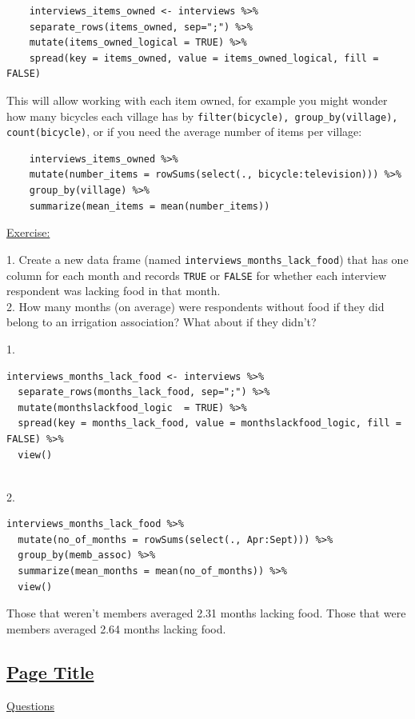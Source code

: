 \documentclass[12pt]{article}
\begin{document}
\begin{verbatim}
    interviews_items_owned <- interviews %>%
    separate_rows(items_owned, sep=";") %>%
    mutate(items_owned_logical = TRUE) %>%
    spread(key = items_owned, value = items_owned_logical, fill = FALSE)
\end{verbatim}
This will allow working with each item owned, for example you might wonder how many bicycles each village has by \texttt{filter(bicycle), group\_by(village), count(bicycle)}, or if you need the average number of items per village:
\begin{verbatim}
    interviews_items_owned %>%
    mutate(number_items = rowSums(select(., bicycle:television))) %>%
    group_by(village) %>%
    summarize(mean_items = mean(number_items))
\end{verbatim}
\vspace{0.5em}
\begin{addmargin}[1cm]{0cm}
\color{gray}
\underline{Exercise:}

1. Create a new data frame (named \texttt{interviews_months_lack_food}) that has one column for each month and records \texttt{TRUE} or \texttt{FALSE} for whether each interview respondent was lacking food in that month.
\\2. How many months (on average) were respondents without food if they did belong to an irrigation association? What about if they didn’t?

\color{black}\vspace{0.5em}

1. \begin{verbatim}
interviews_months_lack_food <- interviews %>%
  separate_rows(months_lack_food, sep=";") %>%
  mutate(monthslackfood_logic  = TRUE) %>%
  spread(key = months_lack_food, value = monthslackfood_logic, fill = FALSE) %>%
  view()
\end{verbatim} 
\\2. \begin{verbatim}
interviews_months_lack_food %>%
  mutate(no_of_months = rowSums(select(., Apr:Sept))) %>%
  group_by(memb_assoc) %>%
  summarize(mean_months = mean(no_of_months)) %>%
  view()
\end{verbatim}
Those that weren't members averaged 2.31 months lacking food. Those that were members averaged 2.64 months lacking food.
\end{addmargin}

\newpage
\subsection{\href{http://www.abc.com}{\textbf{Page Title}}}
\color{gray}
\underline{Questions}
\end{document}
